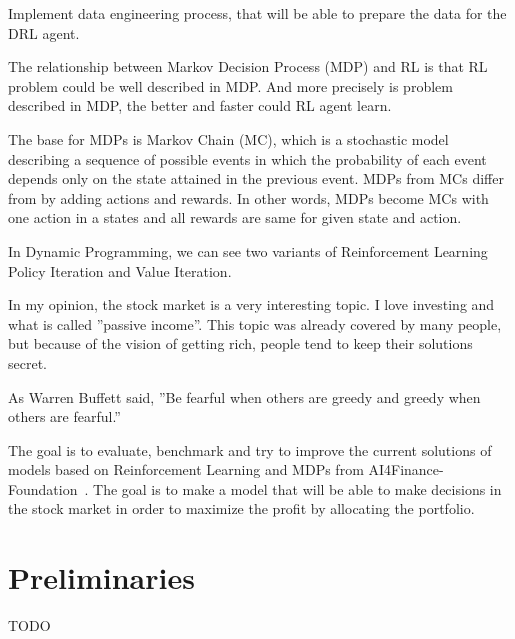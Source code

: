 Implement data engineering process, that will be able to prepare the data for the DRL agent.


The relationship between Markov Decision Process (MDP) and RL is
that RL problem could be well described in MDP\@.
And more precisely is problem described in MDP,
the better and faster could RL agent learn.

The base for MDPs is Markov Chain (MC),
which is a stochastic model describing a sequence of possible events in which the probability
of each event depends only on the state attained in the previous event.
MDPs from MCs differ from by adding actions and rewards.
In other words, MDPs become MCs with one action in a states and all rewards are same
for given state and action.

In Dynamic Programming, we can see two variants of Reinforcement Learning
Policy Iteration and Value Iteration.

In my opinion, the stock market is a very interesting topic.
I love investing and what is called ''passive income''.
This topic was already covered by many people, but because of the
vision of getting rich, people tend to keep their solutions secret.

As Warren Buffett said, ''Be fearful when others are greedy and greedy when others are fearful.''

The goal is to evaluate, benchmark and try to improve the current solutions of models
based on Reinforcement Learning and MDPs from AI4Finance-Foundation~\cite{https://doi.org/10.48550/arxiv.2111.03995}.
The goal is to make a model that will be able to make decisions in the stock market
in order to maximize the profit by allocating the portfolio.






\chapter{Preliminaries}\label{ch:preliminaries}
TODO




